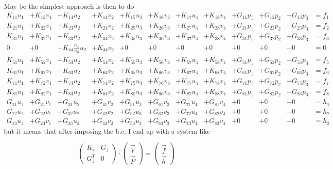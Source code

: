 May be the simplest approach is then to do
{\small
\[
\begin{array}{lllllllllllll}
K_{11} u_1 &+ K_{12} v_1 &+ K_{13} u_2 &+ K_{14} v_2 &+ K_{15} u_3 &+ K_{16} v_3 &+ K_{17}u_4  &+ K_{18}v_4  
&+ G_{11}p_1 &+ G_{12} p_2 &+ G_{13} p_3 & =  f_1 \\
K_{21} u_1 &+ K_{22} v_1 &+ K_{23} u_2 &+ K_{24} v_2 &+ K_{25} u_3 &+ K_{26} v_3 &+ K_{27}u_4  &+ K_{28}v_4  
&+ G_{21}p_1 &+ G_{22} p_2 &+ G_{23} p_3 & =  f_2 \\
K_{31} u_1 &+ K_{32} v_1 &+ K_{33} u_2 &+ K_{34} v_2 &+ K_{35} u_3 &+ K_{36} v_3 &+ K_{37}u_4  &+ K_{38}v_4  
&+ G_{31}p_1 &+ G_{32} p_2 &+ G_{33} p_3 & =  f_3 \\
0 &+ 0 & +K_{44}\frac{n_x}{n_y} u_2 &+ K_{44} v_2 &+ 0 &+ 0 &+ 0  &+ 0  
&+ 0 &+ 0 &+ 0 & =  0 \\
K_{51} u_1 &+ K_{52} v_1 &+ K_{53} u_2 &+ K_{54} v_2 &+ K_{55} u_3 &+ K_{56} v_3 &+ K_{57}u_4  &+ K_{58}v_4  
&+ G_{51}p_1 &+ G_{52} p_2 &+ G_{53} p_3 & =  f_5 \\
K_{61} u_1 &+ K_{62} v_1 &+ K_{63} u_2 &+ K_{64} v_2 &+ K_{65} u_3 &+ K_{66} v_3 &+ K_{67}u_4  &+ K_{68}v_4  
&+ G_{61}p_1 &+ G_{62} p_2 &+ G_{63} p_3 & =  f_6 \\
K_{71} u_1 &+ K_{72} v_1 &+ K_{73} u_2 &+ K_{74} v_2 &+ K_{75} u_3 &+ K_{76} v_3 &+ K_{77}u_4  &+ K_{78}v_4  
&+ G_{71}p_1 &+ G_{72} p_2 &+ G_{73} p_3 & =  f_7 \\
K_{81} u_1 &+ K_{82} v_1 &+ K_{83} u_2 &+ K_{84} v_2 &+ K_{85} u_3 &+ K_{86} v_3 &+ K_{87}u_4  &+ K_{88}v_4  
&+ G_{81}p_1 &+ G_{82} p_2 &+ G_{83} p_3 & =  f_8 \\
G_{11}u_1 &+ G_{21}v_1 &+ G_{31}u_2 &+ G_{41}v_2 &+ G_{51}u_3 &+ G_{61}v_3 &+ G_{71}u_4 &+ G_{81}v_4 &+0&+0&+0&= h_1 \\
G_{12}u_1 &+ G_{22}v_1 &+ G_{32}u_2 &+ G_{42}v_2 &+ G_{52}u_3 &+ G_{62}v_3 &+ G_{72}u_4 &+ G_{82}v_4 &+0&+0&+0&= h_2 \\
G_{13}u_1 &+ G_{23}v_1 &+ G_{33}u_2 &+ G_{43}v_2 &+ G_{53}u_3 &+ G_{63}v_3 &+ G_{73}u_4 &+ G_{83}v_4 &+0&+0&+0&= h_3
\end{array}
\]
}
but it means that after imposing the b.c. I end up with a system like

\[
\left(
\begin{array}{cc}
K_e & G_1 \\
G_1^T & 0
\end{array}
\right)
\cdot
\left(
\begin{array}{c}
\vec{V} \\
\vec{P}
\end{array}
\right)
=\left(
\begin{array}{c}
\vec{f} \\ \vec{h}
\end{array}
\right)
\]

